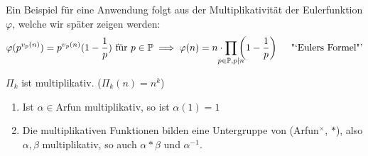 \documentclass[a4paper,twoside,DIV15,BCOR12mm]{scrbook}
\begin{document}
Ein Beispiel für eine Anwendung folgt aus der Multiplikativität der
Eulerfunktion $\varphi$, welche wir später zeigen werden:
\[ \varphi(p^{v_p(n)}) = p^{v_p(n)}(1-\frac 1 p)\text { für } p\in\MdP \implies
\varphi(n) = n\cdot \prod_{\mathclap{p\in\MdP, p|n}} \left(1-\frac
1p\right)\quad\text{ "`Eulers Formel"'} \]

\begin{beispiel}
$\Pi_k$ ist multiplikativ. ($\Pi_k(n) = n^k$)
\end{beispiel}

\begin{satz}
\begin{enumerate}
\item Ist $\alpha \in \text{Arfun}$ multiplikativ, so ist $\alpha(1)=1$
\item Die multiplikativen Funktionen bilden eine Untergruppe von (Arfun$^\times$, $*$), also $\alpha, \beta$ multiplikativ, so auch $\alpha * \beta$ und $\alpha^{-1}$.
\end{enumerate}
\end{satz}
\end{document}
